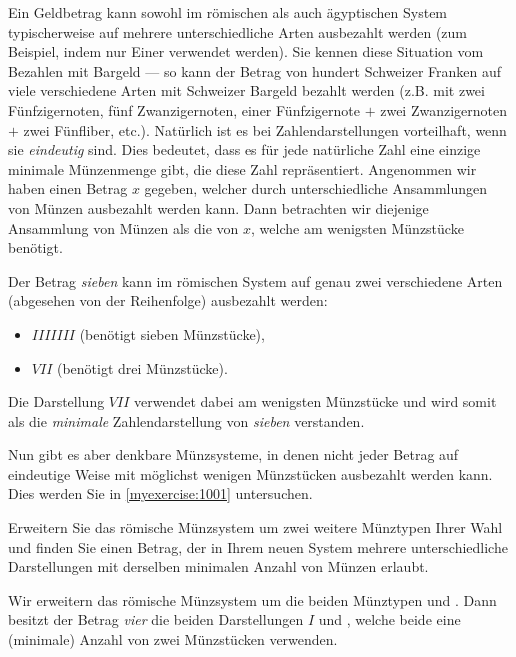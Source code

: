 Ein Geldbetrag kann sowohl im römischen als auch ägyptischen System typischerweise auf mehrere unterschiedliche Arten
ausbezahlt werden (zum Beispiel, indem nur Einer verwendet werden). Sie kennen diese Situation vom Bezahlen mit
Bargeld --- so kann der Betrag von hundert Schweizer Franken auf viele verschiedene Arten mit Schweizer Bargeld bezahlt werden
(z.B. mit zwei Fünfzigernoten, fünf Zwanzigernoten, einer Fünfzigernote $+$ zwei Zwanzigernoten $+$ zwei Fünfliber, etc.). Natürlich ist
es bei Zahlendarstellungen vorteilhaft, wenn sie \textit{eindeutig} sind. Dies bedeutet, dass es für jede natürliche Zahl eine einzige minimale Münzenmenge gibt, die diese Zahl repräsentiert. Angenommen wir haben einen Betrag $x$ gegeben, welcher durch
unterschiedliche Ansammlungen von Münzen ausbezahlt werden kann. Dann betrachten wir diejenige Ansammlung von Münzen als
die  von $x$, welche am wenigsten Münzstücke benötigt.

\begin{myexample}\label{myexample:not_unique}
  Der Betrag \textit{sieben} kann im römischen System auf genau zwei verschiedene Arten (abgesehen von der Reihenfolge) ausbezahlt werden:
  \begin{itemize}
    \item $IIIIIII$ (benötigt sieben Münzstücke),
    \item $VII$ (benötigt drei Münzstücke).
  \end{itemize}
  Die Darstellung $VII$ verwendet dabei am wenigsten Münzstücke und wird somit als die \textit{minimale} Zahlendarstellung von
  \textit{sieben} verstanden.
\end{myexample}
Nun gibt es aber denkbare Münzsysteme, in denen nicht jeder Betrag auf eindeutige Weise mit möglichst wenigen
Münzstücken ausbezahlt werden kann. Dies werden Sie in \cref{myexercise:1001} untersuchen.

\begin{myexercise}\label{myexercise:1001}
  Erweitern Sie das römische Münzsystem um zwei weitere Münztypen Ihrer Wahl und finden Sie einen Betrag, der in Ihrem
  neuen System mehrere unterschiedliche Darstellungen mit derselben minimalen Anzahl von Münzen erlaubt.
  \begin{myanswer}
    Wir erweitern das römische Münzsystem um die beiden Münztypen  und . Dann besitzt der Betrag
    \textit{vier} die beiden Darstellungen $I$ und , welche beide eine (minimale) Anzahl von zwei Münzstücken verwenden.
  \end{myanswer}
\end{myexercise}

